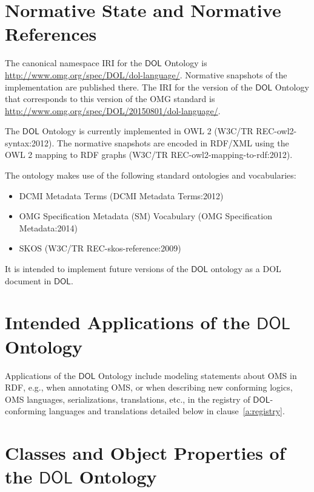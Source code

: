 \documentclass[10pt,fleqn,final]{scrreprt}
\newcommand*{\termref}[1]{\index{#1}#1\xspace}
\newcommand*{\DOL}{\ensuremath{\mathsf{DOL}}\xspace}
\newcommand{\nisref}[1]{#1}
\newenvironment{definitions}[0]{\medskip }{}
\begin{document}
\begin{definitions}
\section{Normative State and Normative References}\label{a:dol-onto-norm}


The canonical namespace IRI for the \DOL Ontology is \url{http://www.omg.org/spec/DOL/dol-language/}.
Normative snapshots of the implementation are published there.
The IRI for the version of the \DOL Ontology that corresponds to this version of the OMG standard is \url{http://www.omg.org/spec/DOL/20150801/dol-language/}.

The \DOL Ontology is currently implemented in OWL 2 (\nisref{W3C/TR REC-owl2-syntax:2012}).
The normative snapshots are encoded in RDF/XML using the OWL 2 mapping to RDF graphs (\nisref{W3C/TR REC-owl2-mapping-to-rdf:2012}).

The ontology makes use of the following standard ontologies and vocabularies:
\begin{itemize}
\item DCMI Metadata Terms (\nisref{DCMI Metadata Terms:2012})
\item OMG Specification Metadata (SM) Vocabulary (\nisref{OMG Specification Metadata:2014})
\item SKOS (\nisref{W3C/TR REC-skos-reference:2009})
\end{itemize}


It is intended to implement future versions of the \DOL ontology as a DOL document in \DOL.

\section{Intended Applications of the \DOL Ontology}\label{a:dol-onto-app}

Applications of the \DOL Ontology include modeling statements about OMS in RDF, e.g., when annotating OMS, or when describing new conforming logics, OMS languages, serializations, translations, etc., in the \termref{registry} of \DOL-conforming languages and translations detailed below in clause~\ref{a:registry}.

\section{Classes and Object Properties of the \DOL Ontology}\label{a:dol-onto-tables}



\end{definitions}
\end{document}
